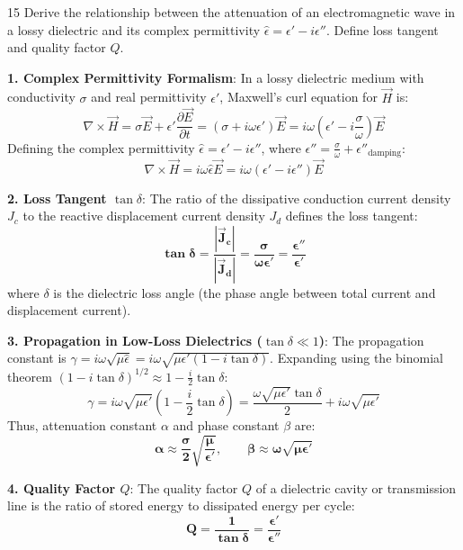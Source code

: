 \begin{theoryq}{15}
Derive the relationship between the attenuation of an electromagnetic wave in a lossy dielectric and its complex permittivity $\hat{\epsilon} = \epsilon' - i\epsilon''$. Define loss tangent and quality factor $Q$.
\end{theoryq}
\begin{theorysol}
\textbf{1. Complex Permittivity Formalism}:
In a lossy dielectric medium with conductivity $\sigma$ and real permittivity $\epsilon'$, Maxwell's curl equation for $\vec{H}$ is:
\begin{equation}
\nabla \times \vec{H} = \sigma \vec{E} + \epsilon'\frac{\partial \vec{E}}{\partial t} = (\sigma + i\omega\epsilon')\vec{E} = i\omega \left(\epsilon' - i\frac{\sigma}{\omega}\right)\vec{E}
\end{equation}
Defining the complex permittivity $\hat{\epsilon} = \epsilon' - i\epsilon''$, where $\epsilon'' = \frac{\sigma}{\omega} + \epsilon''_{\text{damping}}$:
\begin{equation}
\nabla \times \vec{H} = i\omega \hat{\epsilon} \vec{E} = i\omega (\epsilon' - i\epsilon'')\vec{E}
\end{equation}

\textbf{2. Loss Tangent $\tan\delta$}:
The ratio of the dissipative conduction current density $J_c$ to the reactive displacement current density $J_d$ defines the loss tangent:
\begin{equation}
\mathbf{\tan\delta = \frac{|\vec{J}_c|}{|\vec{J}_d|} = \frac{\sigma}{\omega \epsilon'} = \frac{\epsilon''}{\epsilon'}}
\end{equation}
where $\delta$ is the dielectric loss angle (the phase angle between total current and displacement current).

\textbf{3. Propagation in Low-Loss Dielectrics ($\tan\delta \ll 1$)}:
The propagation constant is $\gamma = i\omega\sqrt{\mu\hat{\epsilon}} = i\omega\sqrt{\mu\epsilon'(1 - i\tan\delta)}$.
Expanding using the binomial theorem $(1 - i\tan\delta)^{1/2} \approx 1 - \frac{i}{2}\tan\delta$:
\begin{equation}
\gamma = i\omega\sqrt{\mu\epsilon'}\left(1 - \frac{i}{2}\tan\delta\right) = \frac{\omega\sqrt{\mu\epsilon'}\tan\delta}{2} + i\omega\sqrt{\mu\epsilon'}
\end{equation}
Thus, attenuation constant $\alpha$ and phase constant $\beta$ are:
\begin{equation}
\mathbf{\alpha \approx \frac{\sigma}{2}\sqrt{\frac{\mu}{\epsilon'}}}, \qquad \mathbf{\beta \approx \omega\sqrt{\mu\epsilon'}}
\end{equation}

\textbf{4. Quality Factor $Q$}:
The quality factor $Q$ of a dielectric cavity or transmission line is the ratio of stored energy to dissipated energy per cycle:
\begin{equation}
\mathbf{Q = \frac{1}{\tan\delta} = \frac{\epsilon'}{\epsilon''}}
\end{equation}
\end{theorysol}
\vspace{4mm}

